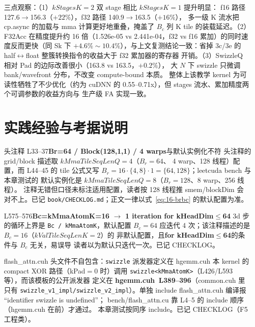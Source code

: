 三点观察：（1）$kStagesK{=}2$ 双 stage 相比 $kStagesK{=}1$ 提升明显：
f16 路径 127.6$\to$156.3（$+22\%$），f32 路径 140.9$\to$163.5（$+16\%$），
多一级 K 流水把 cp.async 的加载与 mma 计算更好地重叠，掩盖了 $B_c$ 列
K tile 的装载延迟。（2）F32Acc 在精度提升约 16 倍（1.526e-05 vs
2.441e-04，f32 vs f16 累加）的同时速度反而更快（同 Sk 下
$+4.6\%\sim10.4\%$），与上文复测结论一致：省掉 3c/3e 的
half$\leftrightarrow$float 整簇转换指令的收益大于 f32 累加器的寄存器
开销。（3）SwizzleQ 相对 Pad 的边际改善很小（163.8 vs 163.5，$+0.2\%$），
大 $N$ 下 swizzle 只微调 bank/wavefront 分布，不改变 compute-bound 本质。
整体上该教学 kernel 为可读性牺牲了不少优化（约为 cuDNN 的
0.55--0.71x），但 stages 流水、累加精度两个可调参数的收益方向与
生产级 FA 实现一致。

\section{实践经验与考据说明}

\begin{kaogu}[F5 配置口径]{头注释 L33--37\textbf{Br=64 / Block(128,1,1) / 4 warps}与默认实例化不符}
  头注释的 grid/block 描述取 $kMmaTileSeqLenQ{=}4$（$B_r{=}64$、
  4 warp、128 线程）配置，而 L44--45 的 tile 公式又写
  $B_r = 16\cdot\{4,8\}\cdot1 = \{64,128\}$；leetcuda bench 与本章测试的
  默认实例化是 $kMmaTileSeqLenQ{=}8$（$B_r{=}128$、8 warp、256 线程）。
  注释无错但口径未标注适用配置，读者按 128 线程推 smem/blockDim 会
  对不上。已记 \texttt{book/\allowbreak{}CHECKLOG.\allowbreak{}md}；正文一律以式~\ref{eq:16-brbc}
  的默认配置为准。
\end{kaogu}

\begin{kaogu}[F5 陈旧注释]{L575--576\textbf{Bc=kMmaAtomK=16 $\to$ 1 iteration for kHeadDim$\le$64}}
  3d 步的循环上界是 \texttt{Bc / kMmaAtomK}，默认配置 $B_c{=}64$
  应迭代 4 次；该注释描述的是 $B_c{=}16$（$kValTileSeqLenK{=}2$）的
  非默认配置，且\textbf{for kHeadDim$\le$64}的条件与 $B_c$ 无关，易误导
  读者以为默认只迭代一次。已记 CHECKLOG。
\end{kaogu}

\begin{kaogu}[工程观察]{flash\_attn.cuh 头文件不自包含：\texttt{swizzle} 派发器定义在 hgemm.cuh}
  本 kernel 的 compact XOR 路径（kPad$=$0 时）调用
  \texttt{swizzle\allowbreak{}<k\allowbreak{}Mma\allowbreak{}Atom\allowbreak{}K>}（L426/L593 等），而该模板的公开派发器
  定义在 \textbf{hgemm.cuh~L389--396}（common.cuh 里只有
  \texttt{swizzle\_\allowbreak{}v1\_\allowbreak{}impl/\allowbreak{}swizzle\_\allowbreak{}v2\_\allowbreak{}impl}）。单独 include
  flash\_attn.cuh 编译报 ``identifier swizzle is undefined''；
  bench/flash\_attn.cu 靠 L4--5 的 include 顺序（hgemm.cuh 在前）才通过。
  本章测试按同序 include。已记 CHECKLOG（F5 工程类）。
\end{kaogu}


